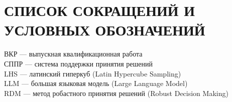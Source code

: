 \chapter*{СПИСОК СОКРАЩЕНИЙ И УСЛОВНЫХ ОБОЗНАЧЕНИЙ}
\begingroup
\setlength{\parindent}{0pt}
ВКР --- выпускная квалификационная работа\\[0.5em]
СППР --- система поддержки принятия решений\\[0.5em]
LHS --- латинский гиперкуб (Latin Hypercube Sampling)\\[0.5em]
LLM --- большая языковая модель (Large Language Model)\\[0.5em]
RDM --- метод робастного принятия решений (Robust Decision Making)
\endgroup
